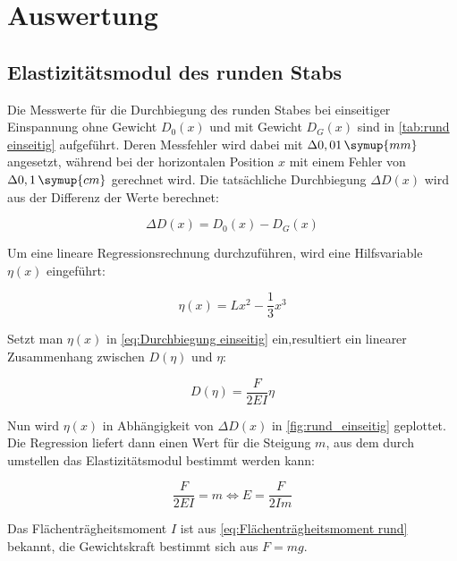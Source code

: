 \section{Auswertung}
\label{sec:Auswertung}

\subsection{Elastizitätsmodul des runden Stabs}  %
\label{sec:Elastizitätsmodul rund}

Die Messwerte für die Durchbiegung des runden Stabes bei einseitiger Einspannung ohne Gewicht $D_{0}(x)$
und mit Gewicht $D_{G}(x)$ sind in \autoref{tab:rund einseitig} aufgeführt.
Deren Messfehler wird dabei mit $\Delta 0,01\,\symup{mm}$ angesetzt, während bei der horizontalen Position
$x$ mit einem Fehler von $\Delta 0,1\,\symup{cm}$ gerechnet wird.
Die tatsächliche Durchbiegung $\Delta D(x)$ wird aus der Differenz der Werte berechnet:

\begin{equation}
  \Delta D(x)= D_{0}(x)-D_{G}(x)
  \label{eq:Delta D}
\end{equation}


Um eine lineare Regressionsrechnung durchzuführen, wird eine Hilfsvariable $\eta(x)$ eingeführt:

\begin{equation}
  \eta(x)=Lx^{2}-\frac{1}{3}x^{3}
  \label{eq:eta einseitig rund}
\end{equation}

Setzt man $\eta(x)$ in \autoref{eq:Durchbiegung einseitig} ein,resultiert ein linearer Zusammenhang zwischen $D(\eta)$ und $\eta$:

\begin{equation}
  D(\eta)=\frac{F}{2EI}\eta
  \label{eq:Geradengleichung}
\end{equation}

Nun wird $\eta(x)$ in Abhängigkeit von $\Delta D(x)$ in \autoref{fig:rund_einseitig} geplottet.
Die Regression liefert dann einen Wert für die Steigung $m$, aus dem durch umstellen das Elastizitätsmodul bestimmt werden kann:

\begin{equation}
  \frac{F}{2EI}=m \Leftrightarrow E=\frac{F}{2Im}
  \label{eq:Elastizitätsmodul aus Steigung}
\end{equation}

Das Flächenträgheitsmoment $I$ ist aus \autoref{eq:Flächenträgheitsmoment rund} bekannt, die Gewichtskraft
bestimmt sich aus $F=mg$.

